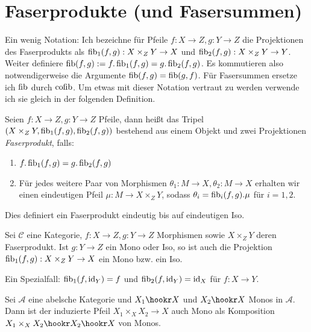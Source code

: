 \section{Faserprodukte (und Fasersummen)}

Ein wenig Notation: Ich bezeichne für Pfeile $f : X\to Z, g: Y\to Z$ die Projektionen des Faserprodukts als $\operatorname{fib}_1(f,g) : X\times_Z Y \to X$ und $\operatorname{fib}_2(f,g) : X\times_Z Y \to Y$. Weiter definiere $\operatorname{fib}(f,g) := f.\operatorname{fib}_1(f,g) = g.\operatorname{fib}_2(f,g)$.
Es kommutieren also notwendigerweise die Argumente $\operatorname{fib}(f,g) = \operatorname{fib}(g,f)$.
Für Fasersummen ersetze ich $\operatorname{fib}$ durch $\operatorname{cofib}$.
Um etwas mit dieser Notation vertraut zu werden verwende ich sie gleich in der folgenden Definition.

\begin{defn}
Seien $f:X\to Z, g:Y\to Z$ Pfeile, dann heißt das Tripel $(X\times_Z Y, \operatorname{fib}_1(f,g), \operatorname{fib}_2(f,g))$ bestehend aus einem Objekt und zwei Projektionen \emph{Faserprodukt}, falls:
\begin{enumerate}
\item $f.\operatorname{fib}_1(f,g) = g.\operatorname{fib}_2(f,g)$
\item Für jedes weitere Paar von Morphismen $\theta_1 : M \to X, \theta_2 : M \to X$ erhalten wir einen eindeutigen Pfeil $\mu : M \to X\times_Z Y$, sodass $\theta_i = \operatorname{fib}_i(f,g) . \mu$ für $i=1,2$.
\end{enumerate}
Dies definiert ein Faserprodukt eindeutig bis auf eindeutigen Iso.
\end{defn}

\begin{prop} Sei $\mathcal C$ eine Kategorie, $f : X \to Z, g : Y\to Z$ Morphismen sowie $X\times_Z Y$ deren Faserprodukt. Ist $g: Y\to Z$ ein Mono oder Iso, so ist auch die Projektion $\operatorname{fib}_1(f,g): X\times_Z Y \to X$ ein Mono bzw. ein Iso.
\end{prop}

\begin{prop}
Ein Spezialfall: $\operatorname{fib}_1(f,\operatorname{id}_Y) = f$ und $\operatorname{fib}_2(f,\operatorname{id}_Y) = \operatorname{id}_X$ für $f : X\to Y$.
\end{prop}

\begin{korr}
Sei $\mathcal A$ eine abelsche Kategorie und
$X_1 \hookr X$ und $X_2 \hookr X$ Monos in $\mathcal A$. Dann ist der induzierte Pfeil $X_1 \times_X X_2 \to X$ auch Mono als Komposition $X_1\times_X X_2 \hookr X_2 \hookr X$ von Monos.
\end{korr}

